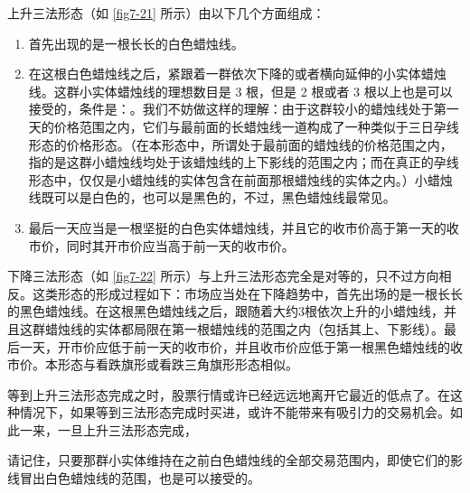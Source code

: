 上升三法形态（如 \autoref{fig7-21} 所示）由以下几个方面组成：
\begin{enumerate}
    \item 首先出现的是一根长长的白色蜡烛线。
    \item 在这根白色蜡烛线之后，紧跟着一群依次下降的或者横向延伸的小实体蜡烛线。这群小实体蜡烛线的理想数目是 3 根，但是 2 根或者 3 根以上也是可以接受的，条件是：。我们不妨做这样的理解：由于这群较小的蜡烛线处于第一天的价格范围之内，它们与最前面的长蜡烛线一道构成了一种类似于三日孕线形态的价格形态。（在本形态中，所谓处于最前面的蜡烛线的价格范围之内，指的是这群小蜡烛线均处于该蜡烛线的上下影线的范围之内；而在真正的孕线形态中，仅仅是小蜡烛线的实体包含在前面那根蜡烛线的实体之内。）小蜡烛线既可以是白色的，也可以是黑色的，不过，黑色蜡烛线最常见。
    \item  最后一天应当是一根坚挺的白色实体蜡烛线，并且它的收市价高于第一天的收市价，同时其开市价应当高于前一天的收市价。
\end{enumerate}

下降三法形态（如 \autoref{fig7-22} 所示）与上升三法形态完全是对等的，只不过方向相反。这类形态的形成过程如下：市场应当处在下降趋势中，首先出场的是一根长长的黑色蜡烛线。在这根黑色蜡烛线之后，跟随着大约3根依次上升的小蜡烛线，并且这群蜡烛线的实体都局限在第一根蜡烛线的范围之内（包括其上、下影线）。最后一天，开市价应低于前一天的收市价，并且收市价应低于第一根黑色蜡烛线的收市价。本形态与看跌旗形或看跌三角旗形形态相似。


等到上升三法形态完成之时，股票行情或许已经远远地离开它最近的低点了。在这种情况下，如果等到三法形态完成时买进，或许不能带来有吸引力的交易机会。如此一来，一旦上升三法形态完成，

\begin{tcolorbox}
    请记住，只要那群小实体维持在之前白色蜡烛线的全部交易范围内，即使它们的影线冒出白色蜡烛线的范围，也是可以接受的。
\end{tcolorbox}

